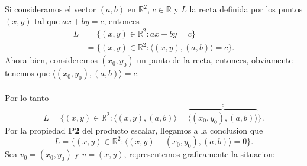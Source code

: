 \documentclass{article}
\theoremstyle{definition}
\theoremstyle{definition}
\theoremstyle{remark}
\begin{document}
\begin{figure}[h]
\centering
\def\svgwidth{0.75\textwidth}

\end{figure}
Si consideramos el vector $(a,b)$ en $\mathbb{R}^2$, $c \in \mathbb{R}$ y $L$ la recta definida por los puntos $(x,y)$ tal que $ax+by=c$, entonces \[
  \begin{aligned}
    L &= \big\{(x,y) \in \mathbb{R}^2 : ax+by=c \big\} \\
      &= \big\{(x,y) \in \mathbb{R}^2 : \langle (x,y),(a,b) \rangle=c \big\}.
  \end{aligned}
\]
Ahora bien, consideremos $(x_0,y_0)$ un punto de la recta, entonces, obviamente tenemos que $\big\langle(x_0,y_0),(a,b)\big\rangle=c$.\\\\ Por lo tanto \[
  L =\big\{(x,y) \in \mathbb{R}^2 : \big\langle (x,y),(a,b)\big\rangle =\overbrace{\big\langle(x_0,y_0),(a,b) \big\rangle}^{c}\big\}.
\]
Por la propiedad \textbf{P2} del producto escalar, llegamos a la conclusion que \[
  L=\big\{(x,y) \in \mathbb{R}^2 : \langle (x,y) - (x_0,y_0),(a,b) \big\rangle =0\big\}.
\]
Sea $v_0=(x_0,y_0)$ y $v=(x,y)$, representemos graficamente la situacion: \\\\
\begin{figure}[h]
\centering
\def\svgwidth{0.75\textwidth}

\end{figure}\\
\end{document}
